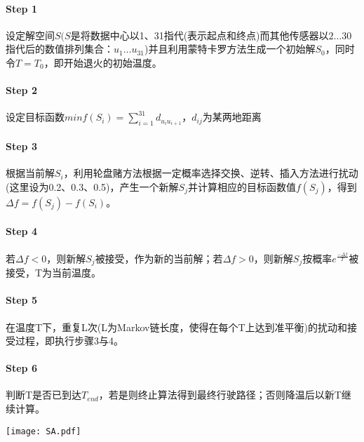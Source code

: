 \documentclass[withoutpreface,bwprint]{cumcmthesis} %
\begin{document}
\begin{minipage}[htbp]{0.65\linewidth}
\paragraph{Step 1}设定解空间$S(S$是将数据中心以1、31指代(表示起点和终点)而其他传感器以$2\ldots30$指代后的数值排列集合：$u_1\ldots u_{31}$)并且利用蒙特卡罗方法生成一个初始解$S_0$，同时令$T=T_0$，即开始退火的初始温度。
\paragraph{Step 2}设定目标函数$min f(S_i)=\sum_{i=1}^{31} d_{u_iu_{i+1}}$，$d_{ij}$为某两地距离
\paragraph{Step 3}根据当前解$S_i$，利用轮盘赌方法根据一定概率选择交换、逆转、插入方法进行扰动(这里设为0.2、0.3、0.5)，产生一个新解$S_j$并计算相应的目标函数值$f(S_j)$，得到$\Delta f=f(S_j)-f(S_i)$。
\paragraph{Step 4}若$\Delta f<0$，则新解$S_j$被接受，作为新的当前解；若$\Delta f>0$，则新解$S_j$按概率$e^{\frac{-\Delta f}{T}}$被接受，T为当前温度。
\paragraph{Step 5}在温度T下，重复L次(L为Markov链长度，使得在每个T上达到准平衡)的扰动和接受过程，即执行步骤3与4。
\paragraph{Step 6}判断T是否已到达$T_{end}$，若是则终止算法得到最终行驶路径；否则降温后以新T继续计算。
\end{minipage}
\qquad
\begin{minipage}[htbp]{0.35\linewidth}
\texttt{[image: SA.pdf]}
\end{minipage}\par
\end{document}
